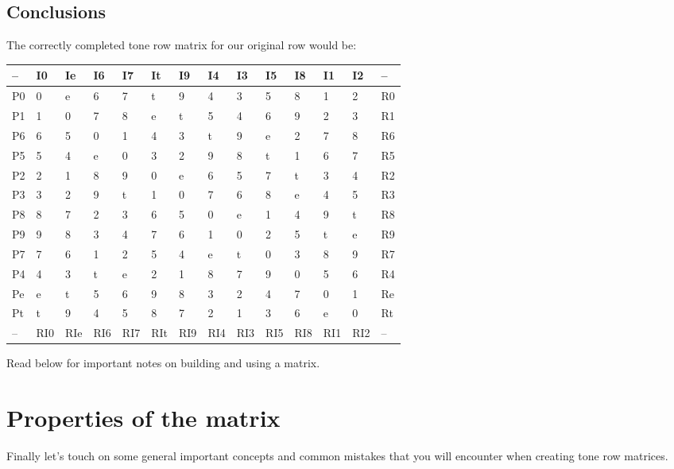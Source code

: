 \documentclass{book}
\begin{document}
\hypertarget{conclusions-66}{%
\subsection{Conclusions}\label{conclusions-66}}

The correctly completed tone row matrix for our original row would be:

\begin{longtable}[]{@{}llllllllllllll@{}}
\toprule
-- & I0 & Ie & I6 & I7 & It & I9 & I4 & I3 & I5 & I8 & I1 & I2 & -- \\
\midrule
\endhead
P0 & 0 & e & 6 & 7 & t & 9 & 4 & 3 & 5 & 8 & 1 & 2 & R0 \\
P1 & 1 & 0 & 7 & 8 & e & t & 5 & 4 & 6 & 9 & 2 & 3 & R1 \\
P6 & 6 & 5 & 0 & 1 & 4 & 3 & t & 9 & e & 2 & 7 & 8 & R6 \\
P5 & 5 & 4 & e & 0 & 3 & 2 & 9 & 8 & t & 1 & 6 & 7 & R5 \\
P2 & 2 & 1 & 8 & 9 & 0 & e & 6 & 5 & 7 & t & 3 & 4 & R2 \\
P3 & 3 & 2 & 9 & t & 1 & 0 & 7 & 6 & 8 & e & 4 & 5 & R3 \\
P8 & 8 & 7 & 2 & 3 & 6 & 5 & 0 & e & 1 & 4 & 9 & t & R8 \\
P9 & 9 & 8 & 3 & 4 & 7 & 6 & 1 & 0 & 2 & 5 & t & e & R9 \\
P7 & 7 & 6 & 1 & 2 & 5 & 4 & e & t & 0 & 3 & 8 & 9 & R7 \\
P4 & 4 & 3 & t & e & 2 & 1 & 8 & 7 & 9 & 0 & 5 & 6 & R4 \\
Pe & e & t & 5 & 6 & 9 & 8 & 3 & 2 & 4 & 7 & 0 & 1 & Re \\
Pt & t & 9 & 4 & 5 & 8 & 7 & 2 & 1 & 3 & 6 & e & 0 & Rt \\
-- & RI0 & RIe & RI6 & RI7 & RIt & RI9 & RI4 & RI3 & RI5 & RI8 & RI1 & RI2 &
-- \\
\bottomrule
\end{longtable}

Read below for important notes on building and using a matrix.

\hypertarget{properties-of-the-matrix}{%
\section{Properties of the matrix}\label{properties-of-the-matrix}}

Finally let's touch on some general important concepts and common mistakes
that you will encounter when creating tone row matrices.
\end{document}
